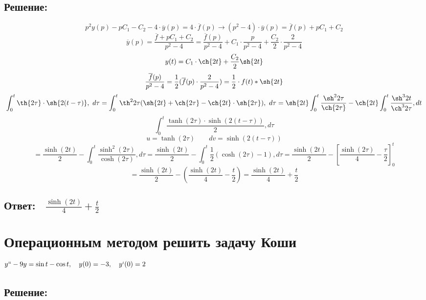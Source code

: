 \documentclass{article}
\begin{document}
        \subsection{Решение:}
        $$p^2y(p) - pC_1 - C_2 - 4 \cdot\overline{y}(p) = 4\cdot \overline{f}(p) \longrightarrow (p^2 - 4) \cdot \overline{y}(p) = \overline{f}(p) + pC_1 + C_2$$
        $$\overline{y}(p) = \frac{\overline{f} + pC_1 + C_2}{p^2 - 4} = \frac{\overline{f}(p)}{p^2 - 4} + C_1 \cdot \frac{p}{p^2 - 4} + \frac{C_2}{2} \cdot \frac{2}{p^2 - 4}$$
        $$y(t) = C_1 \cdot \ch{2t} + \frac{C_2}{2} \sh{2t}$$
        $$\frac{\overline{f}(p)}{p^2 - 4} = \frac{1}{2}(\overline{f}(p) \cdot \frac{2}{p^2 - 4}) = \frac{1}{2} \cdot f(t) * \sh{2t}$$
        \[
        \int_{0}^{t} \th{2\tau} \cdot \sh{2(t - \tau)},\ d\tau = \int_{0}^{t} \th^2{2\tau} (\sh{2t} + \ch{2\tau} - \ch{2t} \cdot \sh{2\tau}),\ d\tau = \sh{2t} \int_{0}^{t} \frac{\sh^2{2\tau}}{\ch{2\tau}} - \ch{2t} \int_{0}^{t} \frac{\sh^3{2t}}{\ch^3{2\tau}}, dt
        \]
        \[
        \int_{0}^{t} \frac{\tanh(2\tau) \cdot \sinh(2(t - \tau))}{2}, d\tau
        \]
        $$u = \tanh(2\tau) \quad\quad dv = \sinh(2(t - \tau))$$
        \[
        = \frac{\sinh(2t)}{2} - \int_{0}^{t} \frac{\sinh^2(2\tau)}{\cosh(2\tau)}, d\tau = \frac{\sinh(2t)}{2} - \int_{0}^{t} \frac{1}{2}\left(\cosh(2\tau) - 1\right), d\tau = \frac{\sinh(2t)}{2} - \left[\frac{\sinh(2\tau)}{4} - \frac{\tau}{2}\right]_{0}^{t} 
        \]
        \[
        = \frac{\sinh(2t)}{2} - \left(\frac{\sinh(2t)}{4} - \frac{t}{2}\right) = \frac{\sinh(2t)}{4} + \frac{t}{2}
        \]
        \subsection{Ответ:$\quad \frac{\sinh(2t)}{4} + \frac{t}{2}$}
        
        \section{Операционным методом решить задачу Коши $y`` - 9y = \sin{t} - \cos{t}, \quad y(0) = -3, \quad y`(0) = 2$ }
        \subsection{Решение:}
        
\end{document}
